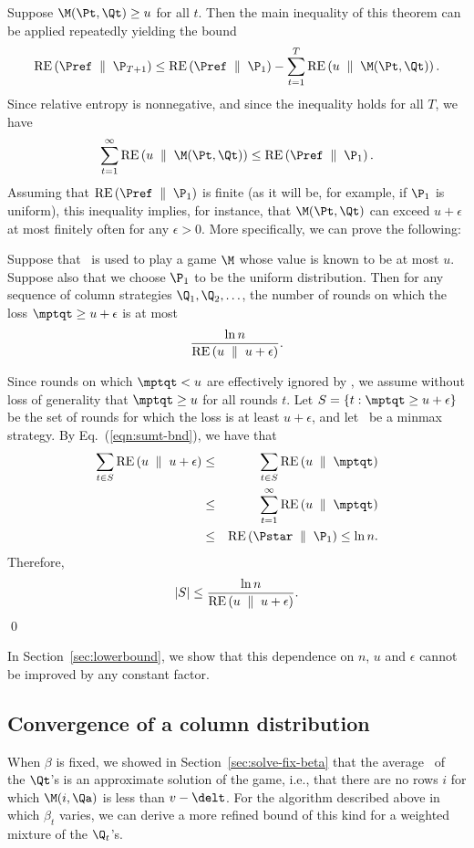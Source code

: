 Suppose $\M(\Pt,\Qt)\geq u$ for all $t$.
Then the main inequality of this theorem can be applied repeatedly yielding the
bound
\[
\RE{\Pref}{\P_{T+1}} \leq \RE{\Pref}{\P_1}
   - \sum_{t=1}^{T} \RE{u}{\M(\Pt, \Qt)}.
\]
Since relative entropy is nonnegative, and since the inequality holds
for all $T$, we have
\begin{equation} \label{eqn:sumt-bnd}
\sum_{t=1}^{\infty} \RE{u}{\M(\Pt, \Qt)} \leq \RE{\Pref}{\P_1}.
\end{equation}
Assuming that $\RE{\Pref}{\P_1}$ is finite (as it will be, for
example, if $\P_1$ is uniform), this inequality implies, for instance,
that $\M(\Pt, \Qt)$ can exceed $u+\epsilon$ at most finitely often for
any $\epsilon>0$. More specifically, we can prove the following:

\begin{corollary} \label{cor:re-upper}
Suppose that \lwalgvar\ is used to play a game $\M$ whose value is
known to be at most $u$.
Suppose also that we choose $\P_1$ to be the uniform distribution.
Then for any sequence of column strategies $\Q_1,\Q_2,\ldots$, the
number of rounds on which the loss $\mptqt \geq u+\epsilon$ is at most
\[ \frac{\ln n}{{\rm RE}\left( {u} \; \parallel \; {u+\epsilon} \right)}. \]
\end{corollary}

\proof
Since rounds on which $\mptqt < u$ are effectively ignored by
\lwalgvar, we assume without loss of generality that $\mptqt\geq u$
for all rounds $t$.
Let $S = \{t : \mptqt \geq u + \epsilon\}$ be the set of rounds for
which the loss is at least $u+\epsilon$, and let \Pstar\ be a minmax
strategy.
By Eq.~(\ref{eqn:sumt-bnd}), we have that
\begin{eqnarray*}
\sum_{t\in S} \RE{u}{u+\epsilon}
  &\leq& \sum_{t\in S} \RE{u}{\mptqt} \\
  &\leq& \sum_{t=1}^\infty \RE{u}{\mptqt} \\
  &\leq& \RE{\Pstar}{\P_1} \leq \ln n.
\end{eqnarray*}
Therefore,
\[ |S| \leq \frac{\ln n}{{\rm RE}\left( {u} \; \parallel \; {u+\epsilon} \right)}. \]
\qed   

In Section~\ref{sec:lowerbound}, we show that this dependence on $n$,
$u$ and $\epsilon$ cannot be improved by any constant factor.

\subsection{Convergence of a column distribution}
\label{sec:solve-col-dist}
When $\beta$ is fixed, we showed in Section~\ref{sec:solve-fix-beta}
that the average \Qa\
of the $\Qt$'s is an approximate solution of the game, i.e., that
there are no rows $i$ for which $\M(i,\Qa)$ is less than $v-\delt$.
For the algorithm described above in which $\beta_t$ varies, we can
derive a more refined bound of this kind for a weighted mixture of the
$\Q_t$'s.

